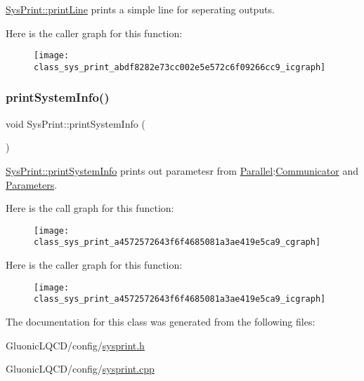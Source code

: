\mbox{\hyperlink{class_sys_print_abdf8282e73cc002e5e572c6f09266cc9}{Sys\+Print\+::print\+Line}} prints a simple line for seperating outputs. 

Here is the caller graph for this function\+:
\nopagebreak
\begin{figure}[H]
\begin{center}
\leavevmode
\texttt{[image: class\_sys\_print\_abdf8282e73cc002e5e572c6f09266cc9\_icgraph]}
\end{center}
\end{figure}
\mbox{\label{class_sys_print_a4572572643f6f4685081a3ae419e5ca9}} 
\subsubsection{\texorpdfstring{printSystemInfo()}{printSystemInfo()}}
{\footnotesize\ttfamily void Sys\+Print\+::print\+System\+Info (\begin{DoxyParamCaption}{ }\end{DoxyParamCaption})\hspace{0.3cm}{\ttfamily [static]}}



\mbox{\hyperlink{class_sys_print_a4572572643f6f4685081a3ae419e5ca9}{Sys\+Print\+::print\+System\+Info}} prints out parametesr from \mbox{\hyperlink{namespace_parallel}{Parallel}}\+:\mbox{\hyperlink{class_communicator}{Communicator}} and \mbox{\hyperlink{class_parameters}{Parameters}}. 

Here is the call graph for this function\+:\nopagebreak
\begin{figure}[H]
\begin{center}
\leavevmode
\texttt{[image: class\_sys\_print\_a4572572643f6f4685081a3ae419e5ca9\_cgraph]}
\end{center}
\end{figure}
Here is the caller graph for this function\+:
\nopagebreak
\begin{figure}[H]
\begin{center}
\leavevmode
\texttt{[image: class\_sys\_print\_a4572572643f6f4685081a3ae419e5ca9\_icgraph]}
\end{center}
\end{figure}


The documentation for this class was generated from the following files\+:\begin{DoxyCompactItemize}
\item 
Gluonic\+L\+Q\+C\+D/config/\mbox{\hyperlink{sysprint_8h}{sysprint.\+h}}\item 
Gluonic\+L\+Q\+C\+D/config/\mbox{\hyperlink{sysprint_8cpp}{sysprint.\+cpp}}\end{DoxyCompactItemize}
